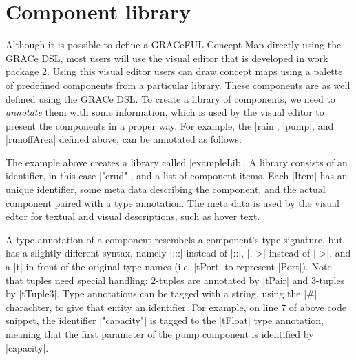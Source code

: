 \documentclass[a4paper]{article}
\begin{document}
\section{Component library}

Although it is possible to define a GRACeFUL Concept Map directly using the
GRACe DSL, most users will use the visual editor that is developed in work
package 2. Using this visual editor users can draw concept maps using a palette
of predefined components from a particular library. These components are as well
defined using the GRACe DSL. To create a library of components, we need to
\emph{annotate} them with some information, which is used by the visual editor
to present the components in a proper way. For example, the |rain|, |pump|, and
|runoffArea| defined above, can be annotated as follows:
The example above creates a library called |exampleLib|. A library consists of
an identifier, in this case |"crud"|, and a list of component items. Each |Item|
has an unique identifier, some meta data describing the component, and the
actual component paired with a type annotation. The meta data is used by the
visual edtor for textual and visual descriptions, such as hover text.

A type annotation of a component resembels a component's type signature, but has
a slightly different syntax, namely |:::| instead of |::|, |.->| instead of
|->|, and a |t| in front of the original type names (i.e. |tPort| to represent
|Port|). Note that tuples need special handling: 2-tuples are annotated by
|tPair| and 3-tuples by |tTuple3|. Type annotations can be tagged with a string,
using the |#| charachter, to give that entity an identifier.  For example, on
line 7 of above code snippet, the identifier |"capacity"| is tagged to the
|tFloat| type annotation, meaning that the first parameter of the pump component
is identified by |capacity|. 
\end{document}
